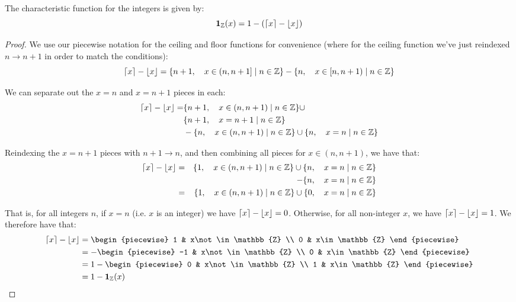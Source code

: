 \begin{theorem}
    The characteristic function for the integers is given by:
    $$
        \mathbf{1}_{\mathbb{Z}}(x)=1-(\lceil x\rceil-\lfloor x\rfloor)
    $$

    \begin{proof}
        We use our piecewise notation for the ceiling and floor functions for convenience (where for the ceiling function we've just reindexed $n\to n+1$ in order to match the conditions):
        $$
            \lceil x\rceil-\lfloor x\rfloor=\{n+1,\quad x\in(n,n+1]\mid n\in\mathbb{Z}\}-\{n,\quad x\in[n,n+1)\mid n\in\mathbb{Z}\}
        $$

        We can separate out the $x=n$ and $x=n+1$ pieces in each:
        \begin{align*}
            \lceil x\rceil-\lfloor x\rfloor = &\{n+1,\quad x\in(n,n+1)\mid n\in\mathbb{Z}\}\cup\\
                                    &\{n+1,\quad x=n+1\mid n\in\mathbb{Z}\}\\
                               &-\{n,\quad x\in(n,n+1)\mid n\in\mathbb{Z}\}\cup\{n,\quad x=n\mid n\in\mathbb{Z}\}
        \end{align*}

        Reindexing the $x=n+1$ pieces with $n+1\to n$, and then combining all pieces for $x\in(n,n+1)$, we have that:
        \begin{align*}
            \lceil x\rceil-\lfloor x\rfloor &= &\{1,\quad x\in(n,n+1)\mid n\in\mathbb{Z}\}\cup\{n,\quad x=n\mid n\in\mathbb{Z}\}\\
                               &&-\{n,\quad x=n\mid n\in\mathbb{Z}\} \\
                               &= &\{1,\quad x\in(n,n+1)\mid n\in\mathbb{Z}\}\cup\{0,\quad x=n\mid n\in\mathbb{Z}\}\\
        \end{align*}

        That is, for all integers $n$, if $x=n$ (i.e. $x$ is an integer) we have $\lceil x\rceil-\lfloor x\rfloor=0$. Otherwise, for all non-integer $x$, we have $\lceil x\rceil-\lfloor x\rfloor=1$. We therefore have that:
        \begin{align*}
            \ceil{x}-\floor{x} &=\begin{piecewise}
                1 & x\not\in\mathbb{Z} \\
                0 & x\in\mathbb{Z}
            \end{piecewise} \\
            &=-\begin{piecewise}
                -1 & x\not\in\mathbb{Z} \\
                0 & x\in\mathbb{Z}
            \end{piecewise} \\
            &=1-\begin{piecewise}
                0 & x\not\in\mathbb{Z} \\
                1 & x\in\mathbb{Z}
            \end{piecewise} \\
            &=1-\mathbf{1}_{\mathbb{Z}}(x)
        \end{align*}
    \end{proof}
\end{theorem}

